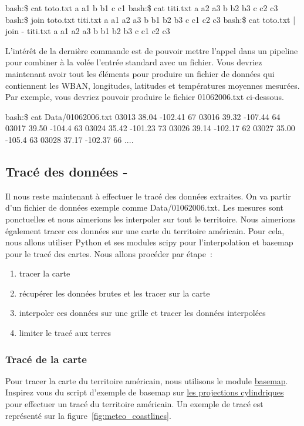 \begin{exempleResultat}
bash:\$ cat toto.txt
a a1
b b1
c c1
bash:\$ cat titi.txt
a a2 a3
b b2 b3
c c2 c3
bash:\$ join toto.txt titi.txt
a a1 a2 a3
b b1 b2 b3
c c1 c2 c3
bash:\$ cat toto.txt | join - titi.txt
a a1 a2 a3
b b1 b2 b3
c c1 c2 c3
\end{exempleResultat}
L'intérêt de la dernière commande est de pouvoir mettre l'appel \join dans un pipeline pour combiner à la volée l'entrée standard avec un fichier. Vous devriez maintenant avoir tout les éléments pour produire un fichier de données qui contiennent les WBAN, longitudes, latitudes et températures moyennes mesurées. Par exemple, vous devriez pouvoir produire le fichier 01062006.txt ci-dessous.
\begin{exempleResultat}
bash:\$ cat Data/01062006.txt
03013 38.04 -102.41 67 
03016 39.32 -107.44 64 
03017 39.50 -104.4 63 
03024 35.42 -101.23 73 
03026 39.14 -102.17 62
03027 35.00 -105.4 63 
03028 37.17 -102.37 66
....
\end{exempleResultat}

\subsection{Tracé des données - \python}

Il nous reste maintenant à effectuer le tracé des données extraites. On va partir d'un fichier de données exemple comme Data/01062006.txt. Les mesures sont ponctuelles et nous aimerions les interpoler sur tout le territoire. Nous aimerions également tracer ces données sur une carte du territoire américain. Pour cela, nous allons utiliser Python et ses modules scipy pour l'interpolation et basemap pour le tracé des cartes. Nous allons procéder par étape~:
\begin{enumerate}
\item tracer la carte
\item récupérer les données brutes et les tracer sur la carte 
\item interpoler ces données sur une grille et tracer les données interpolées
\item limiter le tracé aux terres
\end{enumerate}

\subsubsection{Tracé de la carte}
Pour tracer la carte du territoire américain, nous utilisons le module \href{http://matplotlib.org/basemap/}{basemap}. Inspirez vous du script d'exemple de basemap sur \href{http://matplotlib.org/basemap/users/cyl.html}{les projections cylindriques} pour effectuer un tracé du territoire américain. Un exemple de tracé est représenté sur la figure~\ref{fig:meteo_coastlines}.\\

